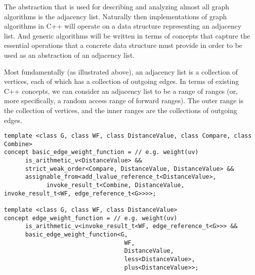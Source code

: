 The abstraction that is used for describing and analyzing almost all graph algorithms is the adjacency list.  Naturally then implementations of graph algorithms in C++ will operate on a data structure representing an adjacency list.  And generic algorithms will be written in terms of concepts that capture the essential operations that a concrete data structure must provide in order to be used as an abstraction of an adjacency list.

Most fundamentally (as illustrated above), an adjacency list is a collection of vertices, each of which has a collection of outgoing edges.  In terms of existing C++ concepts, we can consider an adjacency list to be a range of ranges (or, more specifically, a random access range of forward ranges).  The outer range is the collection of vertices, and the inner ranges are the collections of outgoing edges.



\begin{lstlisting}
template <class G, class WF, class DistanceValue, class Compare, class Combine>
concept basic_edge_weight_function = // e.g. weight(uv)
      is_arithmetic_v<DistanceValue> && 
      strict_weak_order<Compare, DistanceValue, DistanceValue> &&
      assignable_from<add_lvalue_reference_t<DistanceValue>,
            invoke_result_t<Combine, DistanceValue, invoke_result_t<WF, edge_reference_t<G>>>>;

template <class G, class WF, class DistanceValue>
concept edge_weight_function = // e.g. weight(uv)
      is_arithmetic_v<invoke_result_t<WF, edge_reference_t<G>>> &&
      basic_edge_weight_function<G,
                                  WF,
                                  DistanceValue,
                                  less<DistanceValue>,
                                  plus<DistanceValue>>;
\end{lstlisting}

\begin{comment}
      \phil{Queueable isn't being used.}
      \begin{lstlisting}
      // queueableQ can represent std::queue and std::priority\_queue
      template <class Q>
      concept queueable = requires(Q&& q, Q::value_type value) {
      Q::value_type;
      Q::size_type;
      Q::reference;

      {q.top()};
      {q.push(value)};
      {q.pop()};
      {q.empty()};
      {q.size()};
      };
      \end{lstlisting}
\end{comment}



